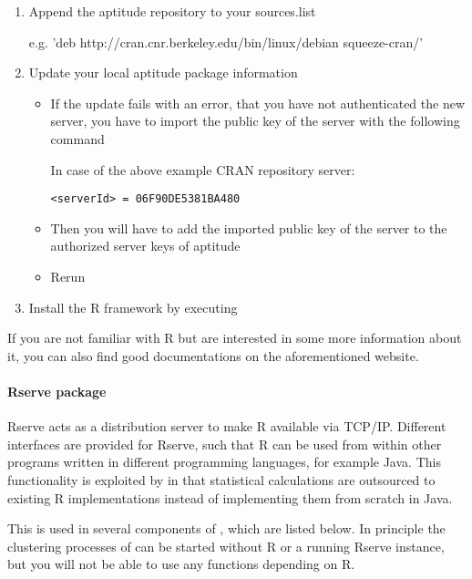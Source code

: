 	\begin{enumerate}
		\item Append the aptitude repository to your sources.list
		
		e.g. 'deb http://cran.cnr.berkeley.edu/bin/linux/debian squeeze-cran/'
		\item Update your local aptitude package information
		
		\begin{itemize}
			\item If the update fails with an error, that you have not authenticated the new server, you have to import the public key of the server with the following command
			
			
			In case of the above example CRAN repository server:
			
			\texttt{<serverId> = 06F90DE5381BA480}
			
			\item Then you will have to add the imported public key of the server to the authorized server keys of aptitude 
			
			\item Rerun 
		\end{itemize}
		\item Install the R framework by executing
		
	\end{enumerate}
	
	If you are not familiar with R but are interested in some more information about it, you can also find good documentations on the aforementioned website.
	\paragraph{Rserve package}
	Rserve acts as a distribution server to make R available via TCP/IP. Different interfaces are provided for Rserve, such that R can be used from within other programs written in different programming languages, for example Java. This functionality is exploited by \clusteval in that statistical calculations are outsourced to existing R implementations instead of implementing them from scratch in Java.
	
	This is used in several components of \clusteval, which are listed below. In principle the clustering processes of \clusteval can be started without R or a running Rserve instance, but you will not be able to use any functions depending on R.
	
